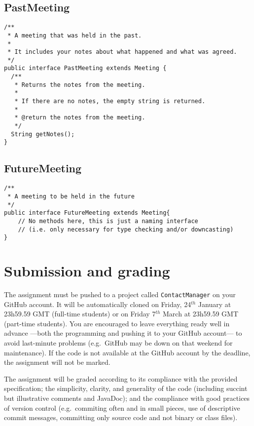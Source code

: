 \documentclass{article}
\begin{document}
\subsection{PastMeeting}
\label{sec:pastmeeting}

\begin{verbatim}
/**
 * A meeting that was held in the past. 
 *
 * It includes your notes about what happened and what was agreed.
 */
public interface PastMeeting extends Meeting {
  /**
   * Returns the notes from the meeting. 
   * 
   * If there are no notes, the empty string is returned. 
   * 
   * @return the notes from the meeting. 
   */
  String getNotes();
}
\end{verbatim}

\subsection{FutureMeeting}
\label{sec:futuremeeting}

\begin{verbatim}
/**
 * A meeting to be held in the future
 */
public interface FutureMeeting extends Meeting{
    // No methods here, this is just a naming interface
    // (i.e. only necessary for type checking and/or downcasting)
}
\end{verbatim}



\section{Submission and grading}
\label{sec:submission-grading}

The assignment must be pushed to a project called
\verb+ContactManager+ on your GitHub account. It will be automatically
cloned on 
%
Friday, 24$^{th}$ January at 23h59.59 GMT (full-time students)
%
or on 
%
Friday 7$^{th}$ March at 23h59.59 GMT (part-time students). 
%
You are encouraged to
leave everything ready well in advance ---both the programming and
pushing it to your GitHub account--- to avoid last-minute problems 
(e.g.~GitHub may be down on that weekend for maintenance). If the
code is not available at the GitHub account by the deadline, the 
assignment will not be marked. 

The assignment will be graded according to its compliance with the
provided specification; the simplicity, clarity, and generality of
the code (including succint but illustrative comments and JavaDoc);
and the compliance with good practices of version control 
(e.g.~commiting often and in small pieces, use of descriptive commit
messages, committing only source code and not binary or class files). 
\end{document}
